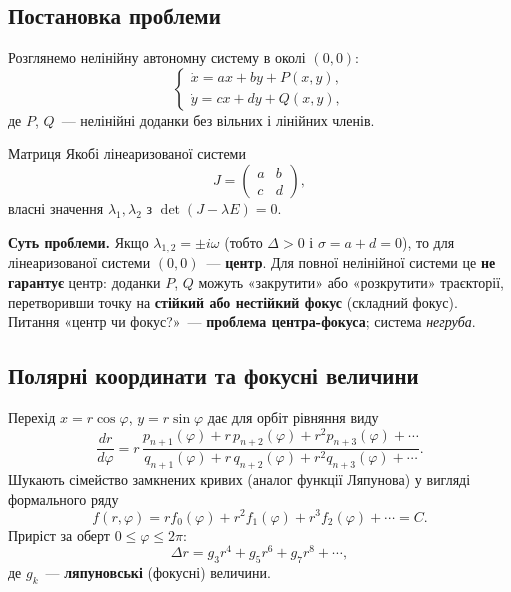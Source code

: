 \documentclass[12pt,a4paper]{article}
\begin{document}
\subsection{Постановка проблеми}

Розглянемо нелінійну автономну систему в околі $(0,0)$:
\begin{equation}\label{eq:center-focus-system}
\begin{cases}
  \dot{x} = ax + by + P(x,y),\\
  \dot{y} = cx + dy + Q(x,y),
\end{cases}
\end{equation}
де $P$, $Q$~--- нелінійні доданки без вільних і лінійних членів.

Матриця Якобі лінеаризованої системи
\begin{equation*}
  J=\begin{pmatrix}a&b\\c&d\end{pmatrix},
\end{equation*}
власні значення $\lambda_1,\lambda_2$ з $\det(J-\lambda E)=0$.

\textbf{Суть проблеми.} Якщо $\lambda_{1,2}=\pm i\omega$ (тобто $\Delta>0$ і
$\sigma=a+d=0$), то для лінеаризованої системи $(0,0)$~--- \textbf{центр}.
Для повної нелінійної системи це \textbf{не гарантує} центр: доданки $P$, $Q$
можуть «закрутити» або «розкрутити» траєкторії, перетворивши точку на
\textbf{стійкий або нестійкий фокус} (складний фокус). Питання «центр чи
фокус?»~--- \textbf{проблема центра-фокуса}; система \emph{негруба}.

\subsection{Полярні координати та фокусні величини}

Перехід $x=r\cos\varphi$, $y=r\sin\varphi$ дає для орбіт рівняння виду
\begin{equation}\label{eq:dr-dphi}
  \frac{dr}{d\varphi}
  = r\,\frac{p_{n+1}(\varphi)+r\,p_{n+2}(\varphi)+r^2 p_{n+3}(\varphi)+\cdots}
         {q_{n+1}(\varphi)+r\,q_{n+2}(\varphi)+r^2 q_{n+3}(\varphi)+\cdots}.
\end{equation}
Шукають сімейство замкнених кривих (аналог функції Ляпунова) у вигляді
формального ряду
\begin{equation}\label{eq:lyapunov-series}
  f(r,\varphi)=r f_0(\varphi)+r^2 f_1(\varphi)+r^3 f_2(\varphi)+\cdots=C.
\end{equation}
Приріст за оберт $0\le\varphi\le2\pi$:
\begin{equation}\label{eq:delta-r}
  \Delta r = g_3 r^4 + g_5 r^6 + g_7 r^8 + \cdots,
\end{equation}
де $g_k$~--- \textbf{ляпуновські} (фокусні) величини.
\end{document}
